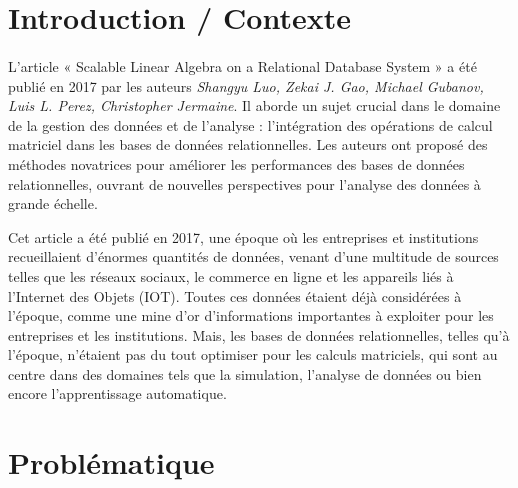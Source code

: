 \documentclass[a4paper, 12pt]{article}
\begin{document}
\newpage		
\tableofcontents %



\clearpage 

\section{Introduction / Contexte}

\paragraph{}
L'article « Scalable Linear Algebra on a Relational Database System »\cite{10.1145/3277006.3277013} a été publié en 2017 par les auteurs \textit{Shangyu Luo, Zekai J. Gao, Michael Gubanov, Luis L. Perez, Christopher Jermaine}. Il aborde un sujet crucial dans le domaine de la gestion des données et de l'analyse : l'intégration des opérations de calcul matriciel dans les bases de données relationnelles. Les auteurs ont proposé des méthodes novatrices pour améliorer les performances des bases de données relationnelles, ouvrant de nouvelles perspectives pour l'analyse des données à grande échelle.

Cet article a été publié en 2017, une époque où les entreprises et institutions recueillaient d'énormes quantités de données, venant d'une multitude de sources telles que les réseaux sociaux, le commerce en ligne et les appareils liés à l'Internet des Objets (IOT). Toutes ces données étaient déjà considérées à l'époque, comme une mine d'or d'informations importantes à exploiter pour les entreprises et les institutions. Mais, les bases de données relationnelles, telles qu'à l'époque, n'étaient pas du tout optimiser pour les calculs matriciels, qui sont au centre dans des domaines tels que la simulation, l'analyse de données ou bien encore l'apprentissage automatique.

\clearpage 
\section{Problématique}
\end{document}
